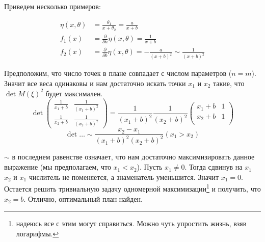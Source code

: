 Приведем несколько примеров:
\begin{ex}
\begin{equation}
\label{rationExm1}
\begin{split}
\eta(x,\theta) &= \frac{\theta_1}{x+\theta_2} = \frac{a}{x+b}\\
f_1(x) &= \frac{\partial}{\partial{a}}\eta(x,\theta) = \frac{1}{x+b}\\
f_2(x) &= \frac{\partial}{\partial{b}} \eta(x,\theta) = -\frac{a}{(x+b)^2} \sim \frac{1}{(x+b)^2}
\end{split}
\end{equation}

Предположим, что число точек в плане совпадает с числом параметров ($n=m$). Значит все веса одинаковы и нам достаточно искать точки $x_1$ и $x_2$ такие, что $\det M(\xi)^2$ будет максимален.
\begin{equation}
\det \begin{pmatrix} \frac{1}{x_1 + b} & \frac{1}{(x_1+b)^2} \\ 
\frac{1}{x_2 + b} & \frac{1}{(x_2 + b)^2}
\end{pmatrix} = \frac{1}{(x_1+b)^2}\frac{1}{(x_2+b)^2}\begin{pmatrix}
x_1 + b & 1 \\ 
x_2 + b & 1 \\
\end{pmatrix}
\end{equation}
\begin{equation*}
\det … \sim \frac{x_2 - x_1}{(x_1+b)^2(x_2+b)^2} (x_1 > x_2)
\end{equation*}

$\sim$ в последнем равенстве означает, что нам достаточно максимизировать данное выражение (мы предполагаем, что $x_1 < x_2$). Пусть $x_1 \neq 0$. Тогда сдвинув на $x_1$ $x_2$ и $x_1$ числитель не поменяется, а знаменатель уменьшится. Значит $x_1 = 0$. Остается решить тривиальную задачу одномерной максимизации\footnote{надеюсь все с этим могут справиться. Можно чуть упростить жизнь, взяв логарифмы.} и получить, что $x_2 = b$.
Отлично, оптимальный план найден.

\end{ex}

